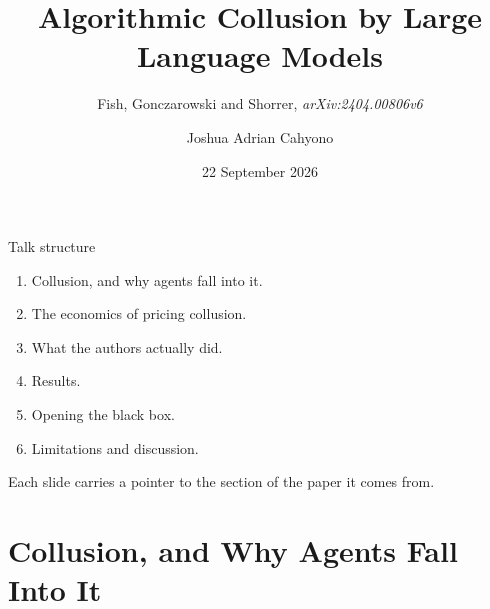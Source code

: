 \documentclass[aspectratio=169,9pt]{beamer}
\title[Algorithmic Collusion by LLMs]{Algorithmic Collusion by Large Language Models}
\subtitle{Fish, Gonczarowski and Shorrer, \textit{arXiv:2404.00806v6}}
\author{Joshua Adrian Cahyono}
\institute{EPIC LAB Nanyang Technological University}
\date{22 September 2026}
\newcommand{\muted}[1]{\textcolor{EPICMuted}{#1}}
\begin{document}
\begin{frame}[plain]
  \titlepage
\end{frame}

\begin{frame}{Talk structure}
\vfill
{\Large
\begin{enumerate}
    \setlength{\itemsep}{0.38cm}
    \item Collusion, and why agents fall into it.
    \item The economics of pricing collusion.
    \item What the authors actually did.
    \item Results.
    \item Opening the black box.
    \item Limitations and discussion.
\end{enumerate}
}
\vfill
\muted{Each slide carries a pointer to the section of the paper it comes from.}
\end{frame}

\section{Collusion, and Why Agents Fall Into It}
\end{document}
